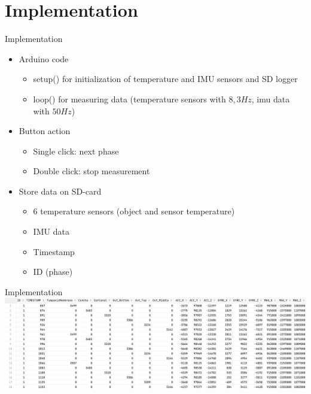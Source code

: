 \documentclass[en]{sdqbeamer}
\begin{document}
\section{Implementation}

\begin{frame}{Implementation}
    \begin{itemize}
        \item Arduino code
        \begin{itemize}
            \item setup() for initialization of temperature and IMU sensors and SD logger
            \item loop() for measuring data (temperature sensors with $8,3Hz$, imu data with $50Hz$)
        \end{itemize}
        \item Button action
        \begin{itemize}
            \item Single click: next phase
            \item Double click: stop measurement
        \end{itemize}
        \item Store data on SD-card
        \begin{itemize}
            \item 6 temperature sensors (object and sensor temperature)
            \item IMU data
            \item Timestamp
            \item ID (phase)
        \end{itemize}
    \end{itemize}
\end{frame}

\begin{frame}{Implementation}
    \includegraphics[width=\linewidth]{../thesis-doc/images/prototype/MeasurementRawDataSnippet_short.png}
\end{frame}
\end{document}
